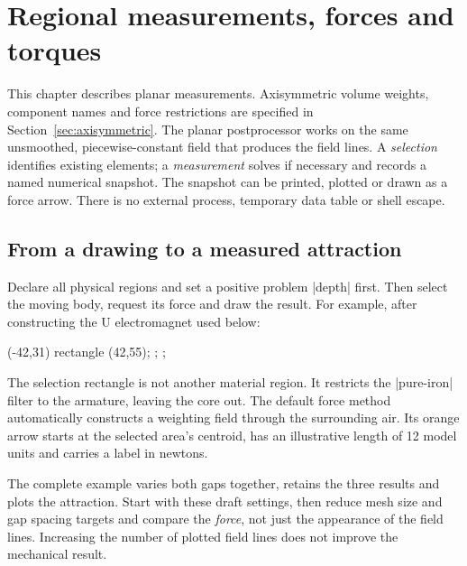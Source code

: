 \section{Regional measurements, forces and torques}
\label{sec:postprocessing}
This chapter describes planar measurements. Axisymmetric volume weights,
component names and force restrictions are specified in Section~\ref{sec:axisymmetric}.
The planar postprocessor works on the same unsmoothed, piecewise-constant field that
produces the field lines. A \emph{selection} identifies existing elements;
a \emph{measurement} solves if necessary and records a named numerical snapshot.
The snapshot can be printed, plotted or drawn as a force arrow. There is no
external process, temporary data table or shell escape.

\subsection{From a drawing to a measured attraction}
Declare all physical regions and set a positive problem |depth| first. Then
select the moving body, request its force and draw the result. For example,
after constructing the U electromagnet used below:
\begin{codeexample}
\path[femm/selection={name=armature,material=pure-iron}]
  (-42,31) rectangle (42,55);
\path[femm/measure={name=pull,selection=armature,quantity=force}];
;
\end{codeexample}
The selection rectangle is not another material region. It restricts the
|pure-iron| filter to the armature, leaving the core out. The default force
method automatically constructs a weighting field through the surrounding air.
Its orange arrow starts at the selected area's centroid, has an illustrative
length of 12 model units and carries a label in newtons.

The complete example varies both gaps together, retains the three results and
plots the attraction. Start with these draft settings, then reduce mesh size
and gap spacing targets and compare the \emph{force}, not just the appearance
of the field lines. Increasing the number of plotted field lines does not
improve the mechanical result.

